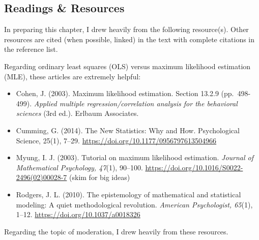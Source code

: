 \documentclass[
  11pt,
]{book}
\providecommand{\tightlist}{%
  \setlength{\itemsep}{0pt}\setlength{\parskip}{0pt}}
\begin{document}
\hypertarget{readings-resources-6}{%
\subsection{Readings \& Resources}\label{readings-resources-6}}

In preparing this chapter, I drew heavily from the following resource(s). Other resources are cited (when possible, linked) in the text with complete citations in the reference list.

Regarding ordinary least squares (OLS) versus maximum likelihood estimation (MLE), these articles are extremely helpful:

\begin{itemize}
\tightlist
\item
  Cohen, J. (2003). Maximum likelihood estimation. Section 13.2.9 (pp.~498-499). \emph{Applied multiple regression/correlation analysis for the behavioral sciences} (3rd ed.). Erlbaum Associates.
\item
  Cumming, G. (2014). The New Statistics: Why and How. Psychological Science, 25(1), 7--29. \url{https://doi.org/10.1177/0956797613504966}
\item
  Myung, I. J. (2003). Tutorial on maximum likelihood estimation. \emph{Journal of Mathematical Psychology, 47}(1), 90--100. \url{https://doi.org/10.1016/S0022-2496(02)00028-7} (skim for big ideas)
\item
  Rodgers, J. L. (2010). The epistemology of mathematical and statistical modeling: A quiet methodological revolution. \emph{American Psychologist, 65}(1), 1--12. \url{https://doi.org/10.1037/a0018326}
\end{itemize}

Regarding the topic of moderation, I drew heavily from these resources.
\end{document}
